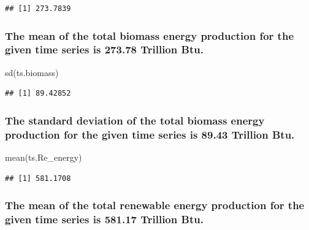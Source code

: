 \documentclass[
]{article}
\newenvironment{Shaded}{\begin{snugshade}}{\end{snugshade}}
\newcommand{\FunctionTok}[1]{\textcolor[rgb]{0.00,0.00,0.00}{#1}}
\newcommand{\NormalTok}[1]{#1}
\begin{document}
\begin{verbatim}
## [1] 273.7839
\end{verbatim}

\hypertarget{the-mean-of-the-total-biomass-energy-production-for-the-given-time-series-is-273.78-trillion-btu.}{%
\subsubsection{The mean of the total biomass energy production for the
given time series is 273.78 Trillion
Btu.}\label{the-mean-of-the-total-biomass-energy-production-for-the-given-time-series-is-273.78-trillion-btu.}}

\begin{Shaded}
\begin{Highlighting}[]
\FunctionTok{sd}\NormalTok{(ts.biomass) }
\end{Highlighting}
\end{Shaded}

\begin{verbatim}
## [1] 89.42852
\end{verbatim}

\hypertarget{the-standard-deviation-of-the-total-biomass-energy-production-for-the-given-time-series-is-89.43-trillion-btu.}{%
\subsubsection{The standard deviation of the total biomass energy
production for the given time series is 89.43 Trillion
Btu.}\label{the-standard-deviation-of-the-total-biomass-energy-production-for-the-given-time-series-is-89.43-trillion-btu.}}

\begin{Shaded}
\begin{Highlighting}[]
\FunctionTok{mean}\NormalTok{(ts.Re\_energy)}
\end{Highlighting}
\end{Shaded}

\begin{verbatim}
## [1] 581.1708
\end{verbatim}

\hypertarget{the-mean-of-the-total-renewable-energy-production-for-the-given-time-series-is-581.17-trillion-btu.}{%
\subsubsection{The mean of the total renewable energy production for the
given time series is 581.17 Trillion
Btu.}\label{the-mean-of-the-total-renewable-energy-production-for-the-given-time-series-is-581.17-trillion-btu.}}
\end{document}
